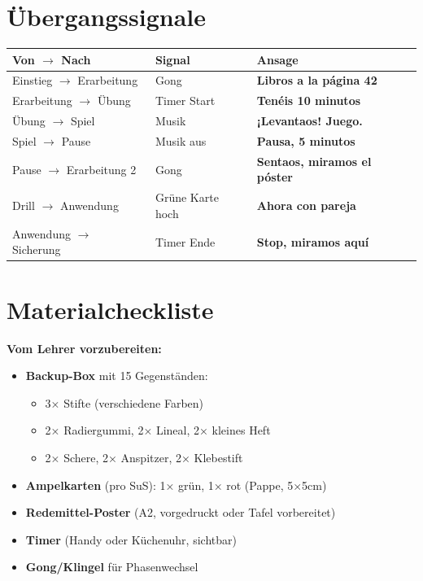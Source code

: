 \documentclass[11pt,a4paper]{article}
\newcommand{\es}[1]{\textbf{#1}}
\begin{document}
\vspace{0.5cm}

\section*{Übergangssignale}

\begin{tabular}{|l|l|l|}
\hline
\textbf{Von $\rightarrow$ Nach} & \textbf{Signal} & \textbf{Ansage} \\
\hline
Einstieg $\rightarrow$ Erarbeitung & Gong & \es{Libros a la página 42} \\
\hline
Erarbeitung $\rightarrow$ Übung & Timer Start & \es{Tenéis 10 minutos} \\
\hline
Übung $\rightarrow$ Spiel & Musik & \es{¡Levantaos! Juego.} \\
\hline
Spiel $\rightarrow$ Pause & Musik aus & \es{Pausa, 5 minutos} \\
\hline
Pause $\rightarrow$ Erarbeitung 2 & Gong & \es{Sentaos, miramos el póster} \\
\hline
Drill $\rightarrow$ Anwendung & Grüne Karte hoch & \es{Ahora con pareja} \\
\hline
Anwendung $\rightarrow$ Sicherung & Timer Ende & \es{Stop, miramos aquí} \\
\hline
\end{tabular}

\vspace{0.5cm}

\section*{Materialcheckliste}

\textbf{Vom Lehrer vorzubereiten:}
\begin{itemize}[nosep]
    \item[$\square$] \textbf{Backup-Box} mit 15 Gegenständen:
    \begin{itemize}[nosep]
        \item 3× Stifte (verschiedene Farben)
        \item 2× Radiergummi, 2× Lineal, 2× kleines Heft
        \item 2× Schere, 2× Anspitzer, 2× Klebestift
    \end{itemize}
    \item[$\square$] \textbf{Ampelkarten} (pro SuS): 1× grün, 1× rot (Pappe, 5×5cm)
    \item[$\square$] \textbf{Redemittel-Poster} (A2, vorgedruckt oder Tafel vorbereitet)
    \item[$\square$] \textbf{Timer} (Handy oder Küchenuhr, sichtbar)
    \item[$\square$] \textbf{Gong/Klingel} für Phasenwechsel
\end{itemize}
\end{document}
